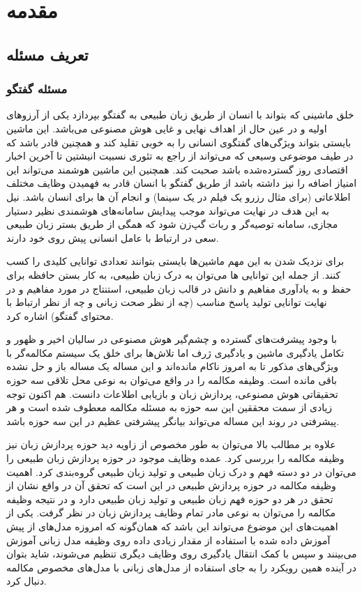 \chapter{مقدمه}\label{Chap:Chap1}
\minitoc

\section{تعریف مسئله} \label{chap1:prob_define}

\subsection{‌مسئله گفتگو}
خلق ماشینی که بتواند با انسان از طریق زبان طبیعی به گفتگو بپردازد یکی از آرزو‌های اولیه و در عین حال از اهداف نهایی و غایی هوش مصنوعی می‌باشد.
این ماشین بایستی بتواند ویژگی‌های گفتگوی انسانی را به خوبی تقلید کند و همچنین قادر باشد که در طیف موضوعی وسیعی که می‌تواند از راجع به تئوری نسبیت انیشتین تا آخرین اخبار اقتصادی روز گسترده‌شده باشد صحبت کند.
همچنین این ماشین هوشمند می‌تواند این امنیاز اضافه را نیز داشته باشد از طریق گفتگو با انسان قادر به فهمیدن وظایف مختلف اطلاعاتی (برای مثال رزرو یک فیلم در یک سینما) و انجام آن ها برای انسان باشد.
نیل به این هدف در نهایت می‌تواند موجب پیدایش سامانه‌های هوشمندی نظیر
دستیار مجازی، سامانه توصیه‌گر و ربات گپ‌زن شود که همگی از طریق 
بستر زبان طبیعی سعی در ارتباط با عامل انسانی پیش‌ روی خود دارند.

برای نزدیک شدن به این مهم ماشین‌ها بایستی بتوانند تعدادی توانایی کلیدی را کسب کنند. از جمله این توانایی ها می‌توان به درک زبان طبیعی، به کار بستن حافظه برای حفظ و به یادآوری مفاهیم و دانش در قالب زبان طبیعی،‌ استنتاج در مورد مفاهیم و در نهایت توانایی تولید پاسخ مناسب (چه از نظر صحت زبانی و چه از نظر ارتباط با محتوای گفتگو) اشاره کرد.

با وجود پیشرفت‌های گسترده و چشم‌گیر هوش مصنوعی در سالیان اخیر و ظهور و تکامل یادگیری ماشین و یادگیری ژرف اما تلاش‌ها برای خلق یک سیستم مکالمه‌گر با ویژگی‌های مذکور تا به امروز ناکام مانده‌اند و این مساله یک مساله باز و حل نشده باقی مانده است.
وظیفه مکالمه را در واقع می‌توان به نوعی محل تلاقی سه حوزه تحقیقاتی
هوش مصنوعی، پردازش زبان و بازیابی اطلاعات دانست.
هم اکنون توجه زیادی از سمت محققین این سه حوزه به مسئله مکالمه معطوف شده است و هر پیشرفتی در روند این مساله می‌تواند بیانگر پیشرفتی عظیم در این سه حوزه باشد.

علاوه بر مطالب بالا می‌توان به طور مخصوص از زاویه دید حوزه پردازش زبان نیز وظیفه مکالمه را بررسی کرد. عمده وظایف موجود در حوزه پردازش زبان طبیعی را می‌توان در دو دسته فهم و درک زبان طبیعی و تولید زبان طبیعی گروه‌بندی کرد. اهمیت وظیفه مکالمه در حوزه پردازش طبیعی در این است که تحقق آن در واقع نشان از تحقق در هر دو حوزه فهم زبان طبیعی و تولید زبان طبیعی دارد و در نتیجه وظیفه مکالمه را می‌توان به نوعی مادر تمام وظایف پردازش زبان در نظر گرفت. یکی از اهمیت‌های این موضوع می‌تواند این باشد که همان‌گونه که امروزه مدل‌های از پیش آموزش داده شده با استفاده از مقدار زیادی داده روی وظیفه مدل زبانی آموزش می‌بینند و سپس با کمک انتقال یادگیری روی وظایف دیگری تنظیم می‌شوند، شاید بتوان در آینده همین رویکرد را به جای استفاده از مدل‌های زبانی با مدل‌های مخصوص مکالمه دنبال کرد.




